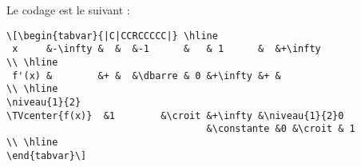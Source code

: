 \documentclass[a4paper,11pt,french]{article}
\begin{document}
\enlargethispage*{.5\baselineskip}
Le codage est le suivant :
\vspace{-.3\baselineskip}
{\footnotesize
\begin{verbatim}
\[\begin{tabvar}{|C|CCRCCCCC|} \hline
 x     &-\infty &  &  &-1      &   & 1      &  &+\infty
\\ \hline
 f'(x) &        &+ &  &\dbarre & 0 &+\infty &+ &
\\ \hline
\niveau{1}{2}
\TVcenter{f(x)}  &1        &\croit &+\infty &\niveau{1}{2}0
                                   &\constante &0 &\croit & 1
\\ \hline
\end{tabvar}\]
\end{verbatim}
}
\end{document}
